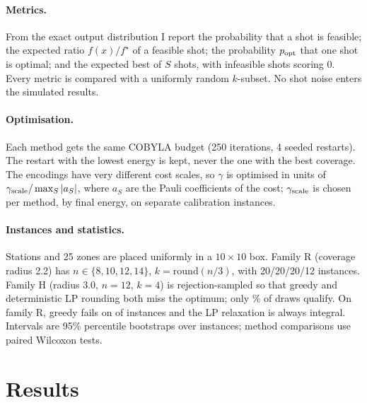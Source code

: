 \documentclass[11pt,a4paper]{article}
\begin{document}
\paragraph{Metrics.} From the exact output distribution I report the probability that a shot is
feasible; the expected ratio $f(x)/f^\star$ of a feasible shot; the probability $p_{\rm opt}$ that
one shot is optimal; and the expected best of $S$ shots, with infeasible shots scoring 0. Every
metric is compared with a uniformly random $k$-subset. No shot noise enters the simulated results.

\paragraph{Optimisation.} Each method gets the same COBYLA budget (250 iterations, 4 seeded
restarts). The restart with the lowest energy is kept, never the one with the best coverage. The
encodings have very different cost scales, so $\gamma$ is optimised in units of $\gamma_{\rm scale}/\max_S|a_S|$,
where $a_S$ are the Pauli coefficients of the cost; $\gamma_{\rm scale}$ is chosen per method, by final
energy, on separate calibration instances.

\paragraph{Instances and statistics.} Stations and 25 zones are placed uniformly in a $10\times10$
box. Family R (coverage radius 2.2) has $n\in\{8,10,12,14\}$, $k=\mathrm{round}(n/3)$, with 20/20/20/12
instances. Family H (radius 3.0, $n=12$, $k=4$) is rejection-sampled so that greedy and
deterministic LP rounding both miss the optimum; only \HardRate\% of draws qualify. On family R,
greedy fails on \GreedyFailR{} of \NR{} instances and the LP relaxation is always integral. Intervals
are 95\% percentile bootstraps over instances; method comparisons use paired Wilcoxon tests.

\section{Results}
\end{document}
